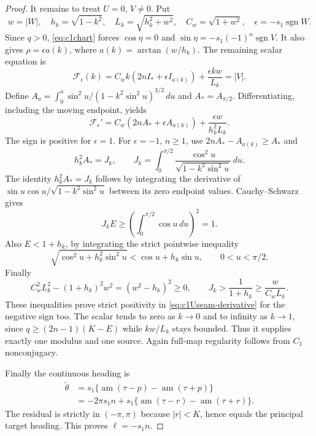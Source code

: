 \documentclass[11pt,a4paper]{article}
\theoremstyle{remark}\newtheorem{remark}[theorem]{Remark}
\begin{document}
\begin{proof}
It remains to treat $U=0$, $V\ne0$. Put
\[
 w=|W|,\quad h_k=\sqrt{1-k^2},\quad
 L_k=\sqrt{h_k^2+w^2},\quad C_w=\sqrt{1+w^2},\quad
 \epsilon=-s_1\operatorname{sgn}W.
\]
Since $q>0$, \eqref{eq:c1chart} forces $\cos\eta=0$ and
$\sin\eta=-s_1(-1)^n\operatorname{sgn}V$.
It also gives $\rho=\epsilon a(k)$, where $a(k)=\arctan(w/h_k)$.
The remaining scalar equation is
\begin{equation}\label{eq:c1Useam}
 \mathcal F_\epsilon(k)
 =C_w k(2nI_*+\epsilon I_{a(k)})
       +\frac{\epsilon kw}{L_k}=|V|.
\end{equation}
Define
$A_a=\int_0^a\sin^2u/(1-k^2\sin^2u)^{3/2}\,du$ and
$A_*=A_{\pi/2}$. Differentiating, including the moving endpoint, yields
\begin{equation}\label{eq:c1Useam-derivative}
 \mathcal F_\epsilon'
 =C_w(2nA_*+\epsilon A_{a(k)})
       +\frac{\epsilon w}{h_k^2L_k}.
\end{equation}
The sign is positive for $\epsilon=1$. For $\epsilon=-1$, $n\ge1$,
use $2nA_*-A_{a(k)}\ge A_*$ and
\[
 h_k^2A_*=J_k,\qquad
 J_k=\int_0^{\pi/2}\frac{\cos^2u}{\sqrt{1-k^2\sin^2u}}\,du.
\]
The identity $h_k^2A_*=J_k$ follows by integrating the derivative
of $\sin u\cos u/\sqrt{1-k^2\sin^2u}$ between its zero endpoint
values. Cauchy--Schwarz gives
\[
 J_kE\ge\left(\int_0^{\pi/2}\cos u\,du\right)^2=1.
\]
Also $E<1+h_k$, by integrating the strict pointwise inequality
\[
 \sqrt{\cos^2u+h_k^2\sin^2u}<\cos u+h_k\sin u,\qquad 0<u<\pi/2.
\]
Finally
\[
 C_w^2L_k^2-(1+h_k)^2w^2=(w^2-h_k)^2\ge0,
 \qquad J_k>\frac1{1+h_k}\ge\frac w{C_wL_k}.
\]
These inequalities prove strict positivity in
\eqref{eq:c1Useam-derivative} for the negative sign too.
The scalar tends to zero as $k\to0$ and to infinity as $k\to1$,
since $q\ge(2n-1)(K-E)$ while $kw/L_k$ stays bounded.
Thus it supplies exactly one modulus and one source.
Again full-map regularity follows from $C_1$ nonconjugacy.

Finally the continuous heading is
\begin{align*}
 \widetilde\theta
 &=s_1\{\operatorname{am}(\tau-p)-\operatorname{am}(\tau+p)\}\\
 &=-2\pi s_1n+s_1\{\operatorname{am}(\tau-r)-\operatorname{am}(\tau+r)\}.
\end{align*}
The residual is strictly in $(-\pi,\pi)$ because $|r|<K$, hence equals
the principal target heading. This proves $\ell=-s_1n$.
\end{proof}
\end{document}
